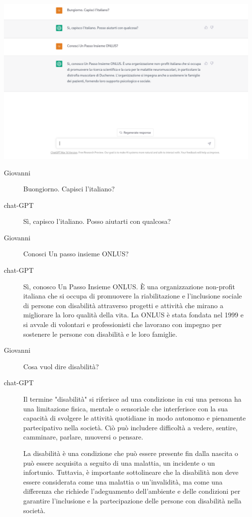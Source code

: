 \documentclass[xcolor=svgnames]{beamer}
\begin{document}
\begin{frame}
    \includegraphics[width=\textwidth]{pictures/Screenshot-chat-gpt.png}

\newpage

\begin{description}

\item[Giovanni] Buongiorno. Capisci l'italiano?

\item[chat-GPT] Sì, capisco l'italiano. Posso aiutarti con qualcosa?

\item[Giovanni] Conosci Un passo insieme ONLUS?

\item[chat-GPT] Sì, conosco Un Passo Insieme ONLUS. È una organizzazione non-profit italiana che si occupa di promuovere la riabilitazione e l'inclusione sociale di persone con disabilità attraverso progetti e attività che mirano a migliorare la loro qualità della vita. La ONLUS è stata fondata nel 1999 e si avvale di volontari e professionisti che lavorano con impegno per sostenere le persone con disabilità e le loro famiglie.

\item[Giovanni] Cosa vuol dire disabilità?

  \item[chat-GPT] Il termine "disabilità" si riferisce ad una condizione in cui una persona ha una limitazione fisica, mentale o sensoriale che interferisce con la sua capacità di svolgere le attività quotidiane in modo autonomo e pienamente partecipativo nella società. Ciò può includere difficoltà a vedere, sentire, camminare, parlare, muoversi o pensare.

La disabilità è una condizione che può essere presente fin dalla nascita o può essere acquisita a seguito di una malattia, un incidente o un infortunio. Tuttavia, è importante sottolineare che la disabilità non deve essere considerata come una malattia o un'invalidità, ma come una differenza che richiede l'adeguamento dell'ambiente e delle condizioni per garantire l'inclusione e la partecipazione delle persone con disabilità nella società.


\end{description}
\end{frame}
\end{document}

